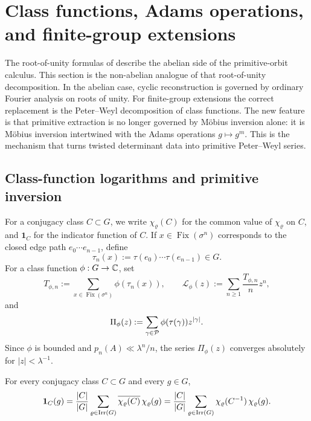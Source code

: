 \section{Class functions, Adams operations, and finite-group extensions}
\label{sec:chebotarev}

The root-of-unity formulas of  describe the
abelian side of the primitive-orbit calculus. This section is the
non-abelian analogue of that root-of-unity decomposition. In the
abelian case, cyclic reconstruction is governed by ordinary Fourier
analysis on roots of unity. For finite-group extensions the correct
replacement is the Peter--Weyl decomposition of class functions. The
new feature is that primitive extraction is no longer governed by
M\"obius inversion alone: it is M\"obius inversion intertwined with the
Adams operations \(g\mapsto g^m\). This is the mechanism that turns
twisted determinant data into primitive Peter--Weyl series.

\subsection{Class-function logarithms and primitive inversion}

For a conjugacy class \(C\subset G\), we write \(\chi_\varrho(C)\) for
the common value of \(\chi_\varrho\) on \(C\), and \(\mathbf 1_C\) for
the indicator function of \(C\). If \(x\in\operatorname{Fix}(\sigma^n)\)
corresponds to the closed edge path \(e_0\cdots e_{n-1}\), define
\[
  \tau_n(x):=\tau(e_0)\cdots\tau(e_{n-1})\in G.
\]
For a class function \(\phi:G\to\mathbb{C}\), set
\begin{equation}\label{eq:class-logarithm-def}
  T_{\phi,n}:=\sum_{x\in\operatorname{Fix}(\sigma^n)}\phi(\tau_n(x)),
  \qquad
  \mathcal L_\phi(z):=\sum_{n\ge 1}\frac{T_{\phi,n}}{n}z^n,
\end{equation}
and
\begin{equation}\label{eq:primitive-class-series-def}
  \Pi_\phi(z):=\sum_{\gamma\in\mathcal P}\phi(\tau(\gamma))z^{|\gamma|}.
\end{equation}
Since \(\phi\) is bounded and \(p_n(A)\ll \lambda^n/n\), the series
\(\Pi_\phi(z)\) converges absolutely for \(|z|<\lambda^{-1}\).

\begin{proposition}
  \label{prop:class-indicator-expansion}
  For every conjugacy class \(C\subset G\) and every \(g\in G\),
  \[
    \mathbf 1_C(g)
    =\frac{|C|}{|G|}
      \sum_{\varrho\in\operatorname{Irr}(G)}
        \overline{\chi_\varrho(C)}\,\chi_\varrho(g)
    =\frac{|C|}{|G|}
      \sum_{\varrho\in\operatorname{Irr}(G)}
        \chi_\varrho(C^{-1})\,\chi_\varrho(g).
  \]
\end{proposition}

